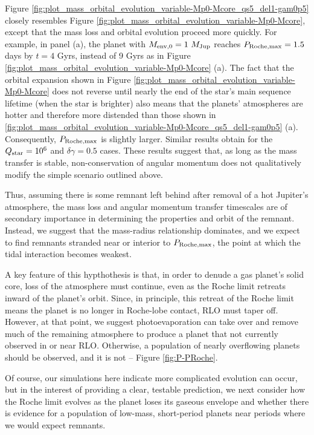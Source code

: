 \documentclass{svjour3}                     %
\begin{document}
Figure \ref{fig:plot_mass_orbital_evolution_variable-Mp0-Mcore_qs5_del1-gam0p5} closely resembles Figure \ref{fig:plot_mass_orbital_evolution_variable-Mp0-Mcore}, except that the mass loss and orbital evolution proceed more quickly. For example, in panel (a), the planet with $M_{\rm env, 0} = 1\ M_{\rm Jup}$ reaches $P_{\rm Roche, max} = 1.5$ days by $t = 4$ Gyrs, instead of 9 Gyrs as in Figure \ref{fig:plot_mass_orbital_evolution_variable-Mp0-Mcore} (a). The fact that the orbital expansion shown in Figure \ref{fig:plot_mass_orbital_evolution_variable-Mp0-Mcore} does not reverse until nearly the end of the star's main sequence lifetime (when the star is brighter) also means that the planets' atmospheres are hotter and therefore more distended than those shown in \ref{fig:plot_mass_orbital_evolution_variable-Mp0-Mcore_qs5_del1-gam0p5} (a). Consequently, $P_{\rm Roche, max}$ is slightly larger. Similar results obtain for the $Q_{\rm star} = 10^6$ and $\delta \gamma = 0.5$ cases. These results suggest that, as long as the mass transfer is stable, non-conservation of angular momentum does not qualitatively modify the simple scenario outlined above. 

Thus, assuming there is some remnant left behind after removal of a hot Jupiter's atmosphere, the mass loss and angular momentum transfer timescales are of secondary importance in determining the properties and orbit of the remnant. Instead, we suggest that the mass-radius relationship dominates, and we expect to find remnants stranded near or interior to $P_{\rm Roche, max}$, the point at which the tidal interaction becomes weakest. 

A key feature of this hypthothesis is that, in order to denude a gas planet's solid core, loss of the atmosphere must continue, even as the Roche limit retreats inward of the planet's orbit. Since, in principle, this retreat of the Roche limit means the planet is no longer in Roche-lobe contact, RLO must taper off. However, at that point, we suggest photoevaporation can take over and remove much of the remaining atmosphere to produce a planet that not currently observed in or near RLO. Otherwise, a population of nearly overflowing planets should be observed, and it is not -- Figure \ref{fig:P-PRoche}.

Of course, our simulations here indicate more complicated evolution can occur, but in the interest of providing a clear, testable prediction, we next consider how the Roche limit evolves as the planet loses its gaseous envelope and whether there is evidence for a population of low-mass, short-period planets near periods where we would expect remnants.
\end{document}
